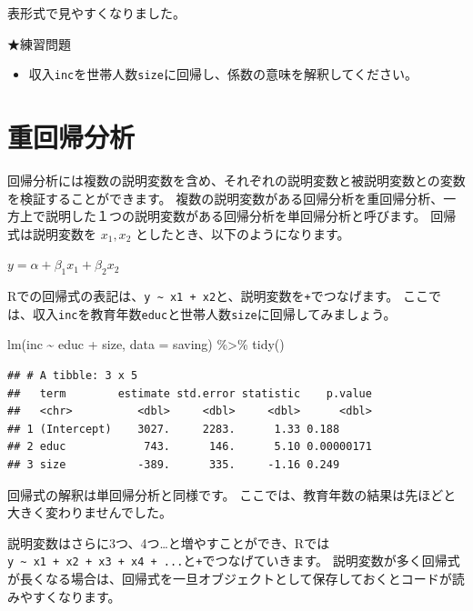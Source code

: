 \documentclass[
]{book}
\newenvironment{Shaded}{\begin{snugshade}}{\end{snugshade}}
\newcommand{\AttributeTok}[1]{\textcolor[rgb]{0.77,0.63,0.00}{#1}}
\newcommand{\FunctionTok}[1]{\textcolor[rgb]{0.00,0.00,0.00}{#1}}
\newcommand{\NormalTok}[1]{#1}
\newcommand{\SpecialCharTok}[1]{\textcolor[rgb]{0.00,0.00,0.00}{#1}}
\providecommand{\tightlist}{%
  \setlength{\itemsep}{0pt}\setlength{\parskip}{0pt}}
\begin{document}
表形式で見やすくなりました。

★練習問題

\begin{itemize}
\tightlist
\item
  収入\texttt{inc}を世帯人数\texttt{size}に回帰し、係数の意味を解釈してください。
\end{itemize}

\hypertarget{ux91cdux56deux5e30ux5206ux6790}{%
\section{重回帰分析}\label{ux91cdux56deux5e30ux5206ux6790}}

回帰分析には複数の説明変数を含め、それぞれの説明変数と被説明変数との変数を検証することができます。
複数の説明変数がある回帰分析を重回帰分析、一方上で説明した１つの説明変数がある回帰分析を単回帰分析と呼びます。
回帰式は説明変数を \(x_1, x_2\) としたとき、以下のようになります。

\(y = \alpha + \beta_1 x_1 + \beta_2 x_2\)

Rでの回帰式の表記は、\texttt{y\ \textasciitilde{}\ x1\ +\ x2}と、説明変数を\texttt{+}でつなげます。
ここでは、収入\texttt{inc}を教育年数\texttt{educ}と世帯人数\texttt{size}に回帰してみましょう。

\begin{Shaded}
\begin{Highlighting}[]
\FunctionTok{lm}\NormalTok{(inc }\SpecialCharTok{\textasciitilde{}}\NormalTok{ educ }\SpecialCharTok{+}\NormalTok{ size, }\AttributeTok{data =}\NormalTok{ saving) }\SpecialCharTok{\%\textgreater{}\%}
  \FunctionTok{tidy}\NormalTok{()}
\end{Highlighting}
\end{Shaded}

\begin{verbatim}
## # A tibble: 3 x 5
##   term        estimate std.error statistic    p.value
##   <chr>          <dbl>     <dbl>     <dbl>      <dbl>
## 1 (Intercept)    3027.     2283.      1.33 0.188     
## 2 educ            743.      146.      5.10 0.00000171
## 3 size           -389.      335.     -1.16 0.249
\end{verbatim}

回帰式の解釈は単回帰分析と同様です。
ここでは、教育年数の結果は先ほどと大きく変わりませんでした。

説明変数はさらに3つ、4つ\ldots と増やすことができ、Rでは\texttt{y\ \textasciitilde{}\ x1\ +\ x2\ +\ x3\ +\ x4\ +\ ...}と\texttt{+}でつなげていきます。
説明変数が多く回帰式が長くなる場合は、回帰式を一旦オブジェクトとして保存しておくとコードが読みやすくなります。
\end{document}
